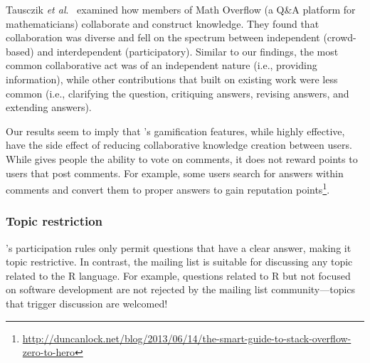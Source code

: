 Tausczik \textit{et al}.~\cite{Tausczik2014} examined how members of Math Overflow (a Q\&A platform for mathematicians) collaborate and construct knowledge. They found that collaboration was diverse and fell on the spectrum between independent (crowd-based) and interdependent (participatory). Similar to our findings, the most common collaborative act was of an independent nature (i.e., providing information), while other contributions that built on existing work were less common (i.e., clarifying the question, critiquing answers, revising answers, and extending answers).

Our results seem to imply that \SO's gamification features, while highly effective, have the side effect of reducing collaborative knowledge creation between users. While \SO gives people the ability to vote on comments, it does not reward points to users that post comments. For example, some users search \SO for answers within comments and convert them to proper answers to gain reputation points\footnote{\url{http://duncanlock.net/blog/2013/06/14/the-smart-guide-to-stack-overflow-zero-to-hero}}.


\subsubsection{Topic restriction}

\SO's participation rules only permit questions that have a clear answer, making it topic restrictive. In contrast, the \RH mailing list is suitable for discussing
any topic related to the R language. For example, questions related to R but not focused on software development are not rejected by the \RH mailing list community---topics that trigger discussion are welcomed!

